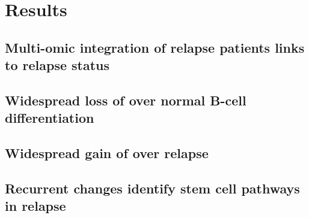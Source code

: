 \section{Results}

\subsection{Multi-omic integration of  relapse patients links  to relapse status}

\subsection{Widespread loss of  over normal B-cell differentiation}

\subsection{Widespread gain of  over  relapse}

\subsection{Recurrent  changes identify stem cell pathways in relapse}
